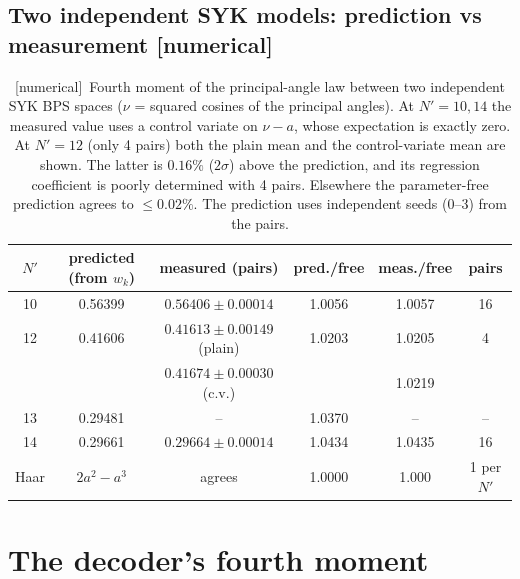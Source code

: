 \documentclass[11pt]{article}
\newcommand{\Np}{N'}
\newcommand{\tagbox}[2]{\textsf{\small\color{#1}[#2]}}
\newcommand{\NUM}{\tagbox{cnum}{numerical}}
\theoremstyle{remark}
\begin{document}
\subsection{Two independent SYK models: prediction vs measurement \NUM}
\begin{table}[h]
\centering\small
\begin{tabular}{@{}cccccc@{}}
\toprule
$\Np$ & predicted (from $w_k$) & measured (pairs) & pred./free & meas./free & pairs\\
\midrule
10 & 0.56399 & $0.56406\pm0.00014$ & 1.0056 & 1.0057 & 16\\
12 & 0.41606 & $0.41613\pm0.00149$ (plain) & 1.0203 & 1.0205 & 4\\
 & & $0.41674\pm0.00030$ (c.v.) & & 1.0219 & \\
13 & 0.29481 & -- & 1.0370 & -- & --\\
14 & 0.29661 & $0.29664\pm0.00014$ & 1.0434 & 1.0435 & 16\\
\midrule
Haar & $2a^2-a^3$ & agrees & 1.0000 & 1.000 & 1 per $\Np$\\
\bottomrule
\end{tabular}
\caption{\NUM\ Fourth moment of the principal-angle law between two independent SYK BPS spaces ($\nu$ = squared
cosines of the principal angles). At $\Np=10,14$ the measured value uses a control variate on $\nu-a$, whose expectation
is exactly zero. At $\Np=12$ (only 4 pairs) both the plain mean and the control-variate mean are shown. The latter is
$0.16\%$ ($2\sigma$) above the prediction, and its regression coefficient is poorly determined with 4 pairs. Elsewhere
the parameter-free prediction agrees to $\le0.02\%$. The prediction uses independent seeds (0--3) from the pairs.}
\label{tab:twomodel}
\end{table}

\section{The decoder's fourth moment}\label{sec:T4}
\end{document}
